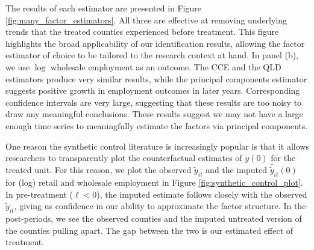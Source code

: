 \documentclass[12pt]{article}
\begin{document}
The results of each estimator are presented in Figure \ref{fig:many_factor_estimators}. All three are effective at removing underlying trends that the treated counties experienced before treatment. This figure highlights the broad applicability of our identification results, allowing the factor estimator of choice to be tailored to the research context at hand. In panel (b), we use $\log$ wholesale employment as an outcome. The CCE and the QLD estimators produce very similar results, while the principal components estimator suggests positive growth in employment outcomes in later years. Corresponding confidence intervals are very large, suggesting that these results are too noisy to draw any meaningful conclusions. These results suggest we may not have a large enough time series to meaningfully estimate the factors via principal components.

One reason the synthetic control literature is increasingly popular is that it allows researchers to transparently plot the counterfactual estimates of $y(0)$ for the treated unit. For this reason, we plot the observed $\tilde{y}_{it}$ and the imputed $\hat{\tilde{y}}_{it}(0)$ for (log) retail and wholesale employment in Figure \ref{fig:synthetic_control_plot}. In pre-treatment ($\ell < 0$), the imputed estimate follows closely with the observed $\tilde{y}_{it}$, giving us confidence in our ability to approximate the factor structure. In the post-periods, we see the observed counties and the imputed untreated version of the counties pulling apart. The gap between the two is our estimated effect of treatment. 
\end{document}
